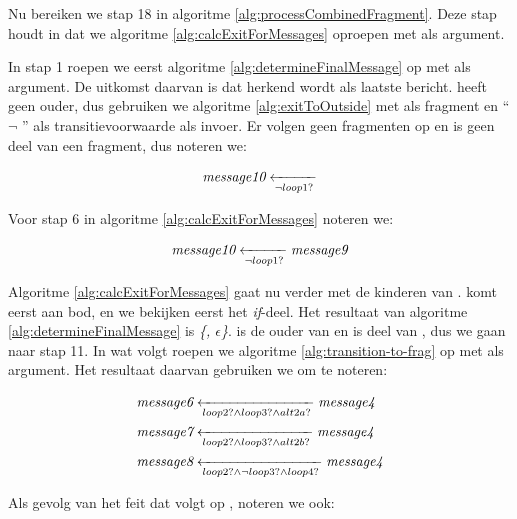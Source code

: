 Nu bereiken we stap 18 in algoritme \ref{alg:processCombinedFragment}. Deze stap houdt in dat we algoritme \ref{alg:calcExitForMessages} oproepen met  als argument.

In stap 1 roepen we eerst algoritme \ref{alg:determineFinalMessage} op met  als argument. De uitkomst daarvan is dat  herkend wordt als laatste bericht.  heeft geen ouder, dus gebruiken we algoritme \ref{alg:exitToOutside} met  als fragment en ``$\lnot$ '' als transitievoorwaarde als invoer. Er volgen geen fragmenten op  en  is geen deel van een fragment, dus noteren we:

\begin{align*}
	\transitionentry{\lnot \fragcond{loop1}}{\fragmessage{message10}}
\end{align*}

Voor stap 6 in algoritme \ref{alg:calcExitForMessages} noteren we:

\begin{align*}
	\transitionentry[\fragmessage{message9}]{\lnot \fragcond{loop1}}{\fragmessage{message10}}
\end{align*}

Algoritme \ref{alg:calcExitForMessages} gaat nu verder met de kinderen van .  komt eerst aan bod, en we bekijken eerst het \textit{if}-deel. Het resultaat van algoritme \ref{alg:determineFinalMessage} is \textit{\{, $\epsilon$\}}.  is de ouder van  en  is deel van , dus we gaan naar stap 11. In wat volgt roepen we algoritme \ref{alg:transition-to-frag} op met  als argument. Het resultaat daarvan gebruiken we om te noteren:

\begin{align*}
	&\transitionentry[\fragmessage{message4}]{\fragcond{loop2} \land \fragcond{loop3} \land \fragcond{alt2a}}{\fragmessage{message6}} \\
	&\transitionentry[\fragmessage{message4}]{\fragcond{loop2} \land \fragcond{loop3} \land \fragcond{alt2b}}{\fragmessage{message7}} \\
	&\transitionentry[\fragmessage{message4}]{\fragcond{loop2} \land \lnot \fragcond{loop3} \land \fragcond{loop4}}{\fragmessage{message8}}
\end{align*}

Als gevolg van het feit dat  volgt op , noteren we ook:

